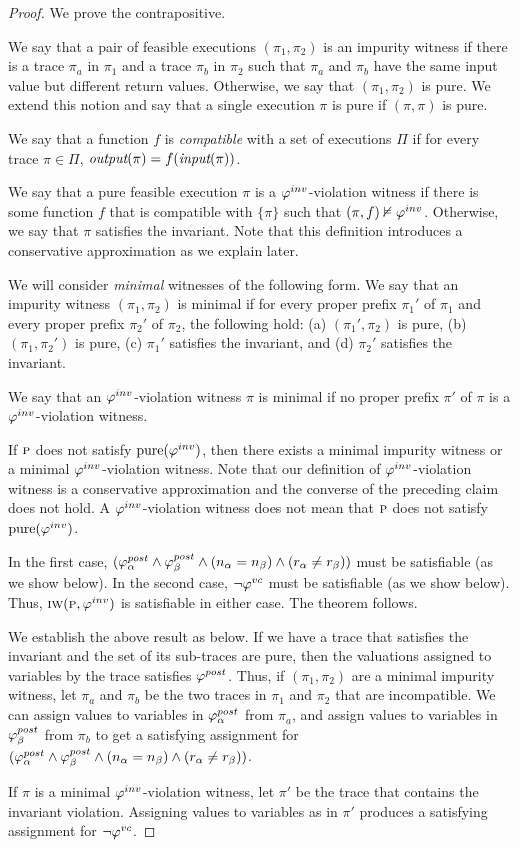 \begin{proof}
We prove the contrapositive.

We say that a pair of feasible executions $(\pi_1, \pi_2)$ is an impurity witness if there is a trace
$\pi_a$ in $\pi_1$ and a trace $\pi_b$ in $\pi_2$ such that $\pi_a$ and $\pi_b$ have the same input
value but different return values. Otherwise, we say that $(\pi_1, \pi_2)$ is pure. We extend
this notion and say that a single execution $\pi$ is pure if $(\pi,\pi)$ is pure.

We say that a function $f$ is \emph{compatible} with a set of executions $\Pi$ if for every trace
$\pi \in \Pi$, $\textit{output}(\pi) = f(\textit{input}(\pi))$.

We say that a pure feasible execution $\pi$ is a $\varphi^{inv}$-violation witness if there is some function $f$
that is compatible with $\{\pi\}$ such that $(\pi,f) \nvDash \varphi^{inv}$. Otherwise, we say that $\pi$ satisfies
the invariant. Note that this definition introduces a conservative approximation as we explain later.

We will consider \emph{minimal} witnesses of the following form.
We say that an impurity witness $(\pi_1, \pi_2)$ is minimal if for every proper prefix $\pi_1'$ of
$\pi_1$ and every proper prefix $\pi_2'$ of $\pi_2$, the following hold:
(a) $(\pi_1',\pi_2)$ is pure,
(b) $(\pi_1,\pi_2')$ is pure,
(c) $\pi_1'$ satisfies the invariant, and
(d) $\pi_2'$ satisfies the invariant.

We say that an $\varphi^{inv}$-violation witness $\pi$ is minimal if no proper prefix $\pi'$ of
$\pi$ is a $\varphi^{inv}$-violation witness.

If $\textsc{p}$ does not satisfy $\mathrm{pure}(\varphi^{inv})$, then there exists a minimal impurity witness
or a minimal $\varphi^{inv}$-violation witness. Note that our definition of $\varphi^{inv}$-violation witness is
a conservative approximation and the converse of the preceding claim does not hold.
A  $\varphi^{inv}$-violation witness does not mean that $\textsc{p}$ does not satisfy $\mathrm{pure}(\varphi^{inv})$.

In the first case, $(\varphi^{post}_\alpha \wedge \varphi^{post}_\beta \wedge (n_\alpha = n_\beta) \wedge (r_\alpha \neq r_\beta))$
must be satisfiable (as we show below). In the second case, $\neg \varphi^{vc}$ must be satisfiable (as we show below).
Thus,  $\textsc{iw}(\textsc{p}, \varphi^{inv})$  is satisfiable in either case. The theorem follows.

We establish the above result as below.
If we have a trace that satisfies the invariant and the set of its sub-traces are pure,
then the valuations assigned to variables by the trace satisfies $\varphi^{post}$.
Thus, if $(\pi_1,\pi_2)$ are a minimal impurity witness, let $\pi_a$ and $\pi_b$
be the two traces in $\pi_1$ and $\pi_2$ that are incompatible.
We can assign values to variables in $\varphi^{post}_\alpha$ from $\pi_a$, and
assign values to variables in $\varphi^{post}_\beta$ from $\pi_b$ to get a satisfying
assignment for $(\varphi^{post}_\alpha \wedge \varphi^{post}_\beta \wedge (n_\alpha = n_\beta) \wedge (r_\alpha \neq r_\beta))$.

If $\pi$ is a minimal $\varphi^{inv}$-violation witness, let $\pi'$ be the trace that contains the invariant violation.
Assigning values to variables as in $\pi'$ produces a satisfying assignment for
$\neg \varphi^{vc}$.
\end{proof}
